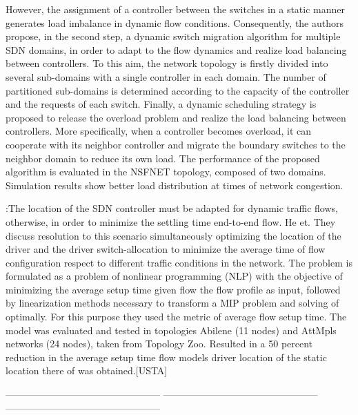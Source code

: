\documentclass[a4paper,10pt]{article}
\begin{document}
However, the assignment of a controller between the switches in a static manner generates load imbalance in dynamic flow conditions. Consequently, the authors propose, in the second step, a dynamic switch migration algorithm for multiple SDN domains, in order to adapt to the flow dynamics and realize load balancing between controllers. To this aim, the network topology is firstly divided into several sub-domains with a single controller in each domain. The number of partitioned sub-domains is determined according to the capacity of the controller and the requests of each switch. Finally, a dynamic scheduling strategy is proposed to release the overload problem and realize the load balancing between controllers. More specifically, when a controller becomes overload, it can cooperate with its neighbor controller and migrate the boundary switches to the neighbor domain to reduce its own load. The performance of the proposed algorithm is evaluated in the NSFNET topology, composed of two domains. Simulation results show better load distribution at times of network congestion.

\cite{HeBa17}:The location of the SDN controller must be adapted for dynamic traffic flows, otherwise, in order to minimize the settling time end-to-end flow. He et. They discuss resolution to this scenario simultaneously optimizing the location of the driver and the driver switch-allocation to minimize the average time of flow configuration respect to different traffic conditions in the network. The problem is formulated as a problem of nonlinear programming (NLP) with the objective of minimizing the average setup time given flow the flow profile as input, followed by linearization methods necessary to transform a MIP problem and solving of optimally. For this purpose they used the metric of average flow setup time.
The model was evaluated and tested in topologies Abilene (11 nodes) and AttMpls networks (24 nodes), taken from Topology Zoo. Resulted in a 50 percent reduction in the average setup time flow models driver location of the static location there of was obtained.[USTA]

------------------------------------------------
------------------------------------------------
------------------------------------------------
\end{document}
